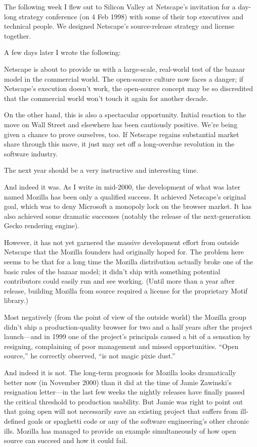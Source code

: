 \documentclass[a4paper,12pt,UTF8,twoside]{ctexbook}
\begin{document}
The following week I flew out to Silicon Valley at Netscape's invitation for a day-long strategy conference (on 4 Feb 1998) with some of their top executives and technical people. We designed Netscape's source-release strategy and license together.

A few days later I wrote the following:

Netscape is about to provide us with a large-scale, real-world test of the bazaar model in the commercial world. The open-source culture now faces a danger; if Netscape's execution doesn't work, the open-source concept may be so discredited that the commercial world won't touch it again for another decade.

On the other hand, this is also a spectacular opportunity. Initial reaction to the move on Wall Street and elsewhere has been cautiously positive. We're being given a chance to prove ourselves, too. If Netscape regains substantial market share through this move, it just may set off a long-overdue revolution in the software industry.

The next year should be a very instructive and interesting time.

And indeed it was. As I write in mid-2000, the development of what was later named Mozilla has been only a qualified success. It achieved Netscape's original goal, which was to deny Microsoft a monopoly lock on the browser market. It has also achieved some dramatic successes (notably the release of the next-generation Gecko rendering engine).

However, it has not yet garnered the massive development effort from outside Netscape that the Mozilla founders had originally hoped for. The problem here seems to be that for a long time the Mozilla distribution actually broke one of the basic rules of the bazaar model; it didn't ship with something potential contributors could easily run and see working. (Until more than a year after release, building Mozilla from source required a license for the proprietary Motif library.)

Most negatively (from the point of view of the outside world) the Mozilla group didn't ship a production-quality browser for two and a half years after the project launch—and in 1999 one of the project's principals caused a bit of a sensation by resigning, complaining of poor management and missed opportunities. ``Open source,'' he correctly observed, ``is not magic pixie dust.''

And indeed it is not. The long-term prognosis for Mozilla looks dramatically better now (in November 2000) than it did at the time of Jamie Zawinski's resignation letter—in the last few weeks the nightly releases have finally passed the critical threshold to production usability. But Jamie was right to point out that going open will not necessarily save an existing project that suffers from ill-defined goals or spaghetti code or any of the software engineering's other chronic ills. Mozilla has managed to provide an example simultaneously of how open source can succeed and how it could fail.
\end{document}
